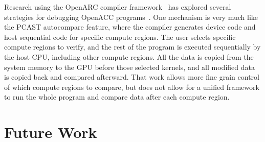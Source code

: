 Research using the OpenARC compiler framework~\cite{lee.hpdc.14} has explored several strategies for debugging OpenACC programs~\cite{lee.ipdps.14}.
One mechanism is very much like the PCAST autocompare feature, where the compiler generates device code and host sequential code for specific compute regions.
The user selects specific compute regions to verify, and the rest of the program is executed sequentially by the host CPU, including other compute regions.
All the data is copied from the system memory to the GPU before those selected kernels, and all modified data is copied back and compared afterward.
That work allows more fine grain control of which compute regions to compare, but does not allow for a unified framework to run the whole program and compare data after each compute region.

\section{Future Work}

